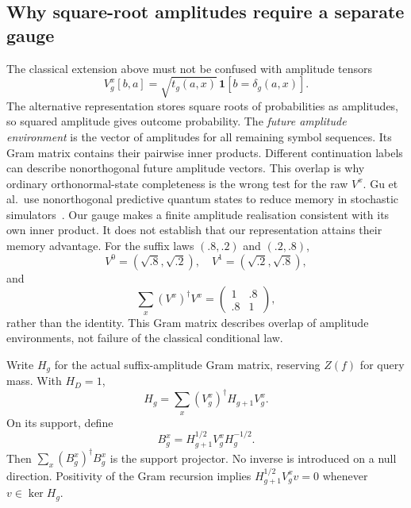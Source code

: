 \subsection{Why square-root amplitudes require a separate gauge}
The classical extension above must not be confused with amplitude tensors
\begin{equation}
 V_g^x[b,a]=\sqrt{t_g(a,x)}\,\mathbf1[b=\delta_g(a,x)] .
\end{equation}
The alternative representation stores square roots of probabilities as amplitudes, so squared amplitude gives outcome probability.
The \emph{future amplitude environment} is the vector of amplitudes for all remaining symbol sequences.
Its Gram matrix contains their pairwise inner products.
Different continuation labels can describe nonorthogonal future amplitude vectors.
This overlap is why ordinary orthonormal-state completeness is the wrong test for the raw \(V^x\).
Gu et al.\ use nonorthogonal predictive quantum states to reduce memory in stochastic simulators~\cite{Gu2012e2bbbd}.
Our gauge makes a finite amplitude realisation consistent with its own inner product.
It does not establish that our representation attains their memory advantage.
For the suffix laws \((.8,.2)\) and \((.2,.8)\),
\begin{equation}
 V^0=(\sqrt{.8},\sqrt{.2}),\quad
 V^1=(\sqrt{.2},\sqrt{.8}),
\end{equation}
and
\begin{equation}
 \sum_x(V^x)^\dagger V^x=
 \begin{pmatrix}1&.8\\.8&1\end{pmatrix},
\end{equation}
rather than the identity.
This Gram matrix describes overlap of amplitude environments, not failure of the classical conditional law.

Write \(H_g\) for the actual suffix-amplitude Gram matrix, reserving \(Z(f)\) for query mass.
With \(H_D=1\),
\begin{equation}
 H_g=\sum_x(V_g^x)^\dagger H_{g+1}V_g^x .
\end{equation}
On its support, define
\begin{equation}
 B_g^x=H_{g+1}^{1/2}V_g^xH_g^{-1/2}.
\end{equation}
Then \(\sum_x(B_g^x)^\dagger B_g^x\) is the support projector.
No inverse is introduced on a null direction.
Positivity of the Gram recursion implies
\(H_{g+1}^{1/2}V_g^xv=0\) whenever \(v\in\ker H_g\).

